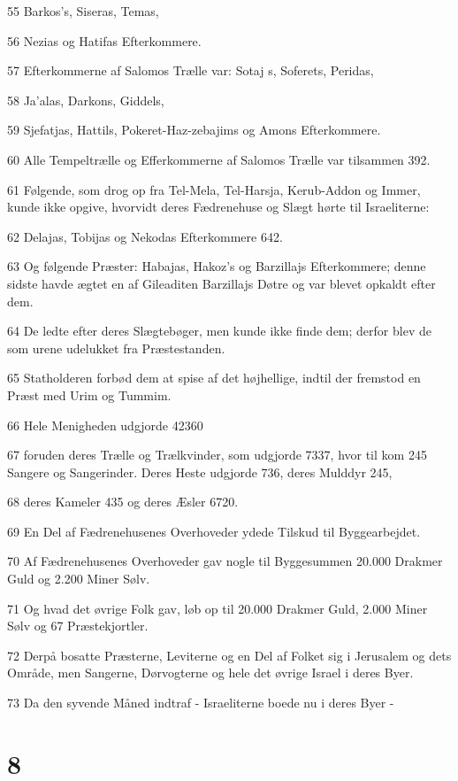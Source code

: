 \par 55 Barkos's, Siseras, Temas,
\par 56 Nezias og Hatifas Efterkommere.
\par 57 Efterkommerne af Salomos Trælle var: Sotaj s, Soferets, Peridas,
\par 58 Ja'alas, Darkons, Giddels,
\par 59 Sjefatjas, Hattils, Pokeret-Haz-zebajims og Amons Efterkommere.
\par 60 Alle Tempeltrælle og Efferkommerne af Salomos Trælle var tilsammen 392.
\par 61 Følgende, som drog op fra Tel-Mela, Tel-Harsja, Kerub-Addon og Immer, kunde ikke opgive, hvorvidt deres Fædrenehuse og Slægt hørte til Israeliterne:
\par 62 Delajas, Tobijas og Nekodas Efterkommere 642.
\par 63 Og følgende Præster: Habajas, Hakoz's og Barzillajs Efterkommere; denne sidste havde ægtet en af Gileaditen Barzillajs Døtre og var blevet opkaldt efter dem.
\par 64 De ledte efter deres Slægtebøger, men kunde ikke finde dem; derfor blev de som urene udelukket fra Præstestanden.
\par 65 Statholderen forbød dem at spise af det højhellige, indtil der fremstod en Præst med Urim og Tummim.
\par 66 Hele Menigheden udgjorde 42360
\par 67 foruden deres Trælle og Trælkvinder, som udgjorde 7337, hvor til kom 245 Sangere og Sangerinder. Deres Heste udgjorde 736, deres Mulddyr 245,
\par 68 deres Kameler 435 og deres Æsler 6720.
\par 69 En Del af Fædrenehusenes Overhoveder ydede Tilskud til Byggearbejdet.
\par 70 Af Fædrenehusenes Overhoveder gav nogle til Byggesummen 20.000 Drakmer Guld og 2.200 Miner Sølv.
\par 71 Og hvad det øvrige Folk gav, løb op til 20.000 Drakmer Guld, 2.000 Miner Sølv og 67 Præstekjortler.
\par 72 Derpå bosatte Præsterne, Leviterne og en Del af Folket sig i Jerusalem og dets Område, men Sangerne, Dørvogterne og hele det øvrige Israel i deres Byer.
\par 73 Da den syvende Måned indtraf - Israeliterne boede nu i deres Byer -

\chapter{8}

